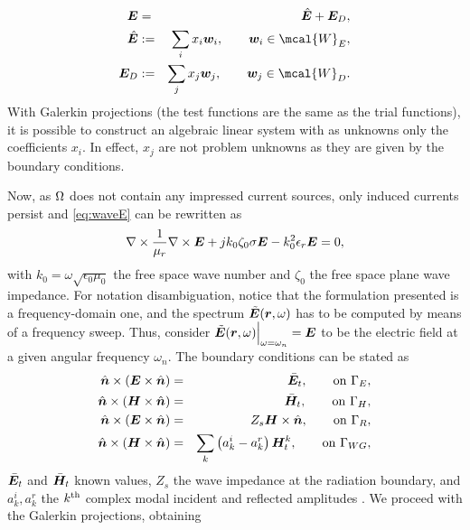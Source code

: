 \begin{eqnarray}
\label{eq:fieldExp}
\mbfit{E} & = & \hat{\mbfit{E}} + \mbfit{E}_D, \nonumber \\
\hat{\mbfit{E}} &:= & \sum_i x_i \mbfit{w}_i, \qquad \mbfit{w}_i \in \mcal{W}_E, \nonumber \\
\mbfit{E}_D&:= & \sum_j x_j \mbfit{w}_j, \qquad \mbfit{w}_j \in \mcal{W}_D.
\end{eqnarray} With Galerkin projections (the test functions are the same as the trial functions), it is possible to construct an algebraic linear system with as unknowns only the coefficients $x_i$. In effect, $x_j$ are not problem unknowns as they are given by the boundary conditions.

\par Now, as $\mathrm{\Omega}$ does not contain any impressed current sources, only induced currents persist and \eqref{eq:waveE} can be rewritten as \cite{FarleMORFE}
\begin{eqnarray}
\nabla \times \frac{1}{\mu_r} \nabla \times \mbfit{E} + jk_0\zeta_0\sigma \mbfit{E}  - k_0^2\epsilon_r \mbfit{E}  =  0,
\end{eqnarray}  with $k_0 = \omega \sqrt{\epsilon_0 \mu_0}$ the free space wave number and $\zeta_0$ the free space plane wave impedance. For notation disambiguation, notice that the formulation presented is a frequency-domain one, and the spectrum $\tilde{\mbfit{E}}(\mbfit{r},\omega)$ has to be computed by means of a frequency sweep. Thus, consider $\tilde{\mbfit{E}}(\mbfit{r},\omega) \Big |_{\omega = \omega_n} = \mbfit{E}$ to be the electric field at a given angular frequency $\omega_n$. The boundary conditions can be stated as
\begin{eqnarray}
\hat{\mbfit{n}} \times ( {\mbfit{E}} \times \hat{\mbfit{n}}) & = & \bar{\mbfit{E}}_t, \qquad \mrm{on} \ \mrm{\Gamma}_E, \nonumber \\
\hat{\mbfit{n}} \times ( {\mbfit{H}} \times \hat{\mbfit{n}}) & = & \bar{\mbfit{H}}_t, \qquad \mrm{on} \ \mrm{\Gamma}_{H}, \nonumber \\
\hat{\mbfit{n}} \times ( {\mbfit{E}} \times \hat{\mbfit{n}}) & = & Z_s {\mbfit{H}} \times \hat{\mbfit{n}}, \qquad \mrm{on} \ \mrm{\Gamma}_R, \nonumber \\
\hat{\mbfit{n}} \times ( {\mbfit{H}} \times \hat{\mbfit{n}}) & = & \sum_{k} \left ( a_k^i - a_k^r \right ) \mbfit{H}_t^k, \qquad \mrm{on} \ \mrm{\Gamma}_{WG},
\end{eqnarray} $\bar{\mbfit{E}}_t$ and $\bar{\mbfit{H}}_t$ known values, $Z_s$  the wave impedance at the radiation boundary, and $a_k^i, a_k^r$ the $k^{\mathrm{th}}$ complex modal incident and reflected amplitudes . We proceed with the Galerkin projections, obtaining \cite{FarleMORFE}

